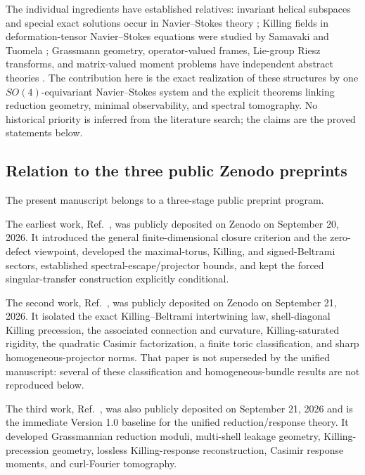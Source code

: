 \documentclass[
 aps,
 prd,
 reprint,
 amsmath,
 amssymb,
 nofootinbib,
 superscriptaddress
]{revtex4-2}
\theoremstyle{definition}
\theoremstyle{remark}
\begin{document}
The individual ingredients have established relatives: invariant helical
subspaces and special exact solutions occur in Navier--Stokes theory
\cite{MahalovTitiLeibovich1990,BogoyavlenskijFuchssteiner2005}; Killing
fields in deformation-tensor Navier--Stokes equations were studied by
Samavaki and Tuomela \cite{SamavakiTuomela2020}; Grassmann geometry,
operator-valued frames, Lie-group Riesz transforms, and matrix-valued moment
problems have independent abstract theories
\cite{Bendokat2024,Sun2006,KaftalLarsonZhang2009,
BoggarapuThangavelu2016,KimseyTrachana2022}.  The contribution here is the
exact realization of these structures by one \(SO(4)\)-equivariant
Navier--Stokes system and the explicit theorems linking reduction geometry,
minimal observability, and spectral tomography.  No historical priority is
inferred from the literature search; the claims are the proved statements
below.



\subsection*{Relation to the three public Zenodo preprints}

The present manuscript belongs to a three-stage public preprint program.

The earliest work, Ref.~\cite{BateninPreece2026}, was publicly deposited on Zenodo on
September 20, 2026.  It introduced the general finite-dimensional closure
criterion and the zero-defect viewpoint, developed the maximal-torus,
Killing, and signed-Beltrami sectors, established spectral-escape/projector
bounds, and kept the forced singular-transfer construction explicitly
conditional.

The second work, Ref.~\cite{BateninPreeceKB2026}, was publicly deposited on Zenodo on
September 21, 2026.  It isolated the exact Killing--Beltrami intertwining
law, shell-diagonal Killing precession, the associated connection and
curvature, Killing-saturated rigidity, the quadratic Casimir factorization,
a finite toric classification, and sharp homogeneous-projector norms.  That
paper is not superseded by the unified manuscript: several of these
classification and homogeneous-bundle results are not reproduced below.

The third work, Ref.~\cite{BateninPreeceUnified2026}, was also publicly deposited on
September 21, 2026 and is the immediate Version 1.0 baseline for the unified
reduction/response theory.  It developed Grassmannian reduction moduli,
multi-shell leakage geometry, Killing-precession geometry, lossless
Killing-response reconstruction, Casimir response moments, and
curl-Fourier tomography.
\end{document}
